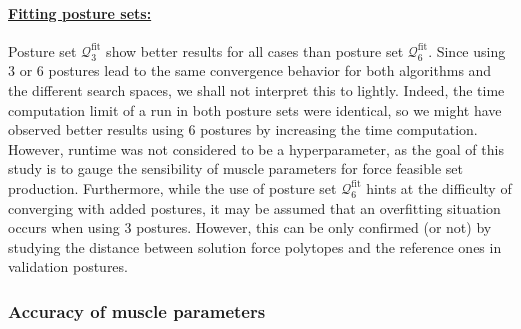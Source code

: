 \paragraph*{\underline{Fitting posture sets:}}
Posture set $\mathcal{Q}_3^{\text{fit}}$ show better results for all cases than posture set $\mathcal{Q}_6^{\text{fit}}$. Since using 3 or 6 postures lead to the same convergence behavior for both algorithms and the different search spaces, we shall not interpret this to lightly. Indeed, the time computation limit of a run in both posture sets were identical, so we might have observed better results using 6 postures by increasing the time computation. However, runtime was not considered to be a hyperparameter, as the goal of this study is to gauge the sensibility of muscle parameters for force feasible set production. Furthermore, while the use of posture set $\mathcal{Q}_6^{\text{fit}}$ hints at the difficulty of converging with added postures, it may be assumed that an overfitting situation occurs when using 3 postures. However, this can be only confirmed (or not) by studying the distance between solution force polytopes and the reference ones in validation postures. 


\subsubsection*{Accuracy of muscle parameters}


